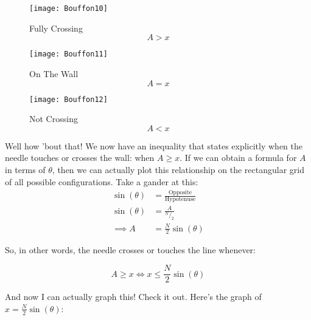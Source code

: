 \documentclass[11pt,titlepage]{article}
\begin{document}
\begin{figure}[h]
\begin{minipage}{0.3\textwidth}
\centering
\vspace{-0.25cm}
\texttt{[image: Bouffon10]}
\caption{Fully Crossing\\ \vspace{-0.5cm}$$A > x$$}
\end{minipage}
\begin{minipage}{0.3\textwidth}
\centering
\texttt{[image: Bouffon11]}
\caption{On The Wall\\\vspace{-0.5cm} $$A = x$$}
\end{minipage}
\begin{minipage}{0.3\textwidth}
\centering
\vspace{0.1cm}
\texttt{[image: Bouffon12]}
\caption{Not Crossing\\ \vspace{-0.5cm}$$A < x$$}
\end{minipage}
\end{figure}

Well how 'bout that! We now have an inequality that states explicitly when the needle touches or crosses the wall: when $A \geq x$. If we can obtain a formula for $A$ in terms of $\theta$, then we can actually plot this relationship on the rectangular grid of all possible configurations. Take a gander at this:
\begin{align*}
\sin{(\theta)} &= \frac{\text{Opposite}}{\text{Hypotenuse}} \\
\sin{(\theta)} &= \frac{A}{^N\!/_2} \\
\implies A &= \frac{N}{2}\sin{(\theta)}
\end{align*}

So, in other words, the needle crosses or touches the line whenever:

$$A \geq x \Longleftrightarrow x \leq \frac{N}{2}\sin{(\theta)}$$

And now I can actually graph this! Check it out. Here's the graph of $x = \frac{N}{2}\sin{(\theta)}$:

\begin{center}

\end{center}
\end{document}
